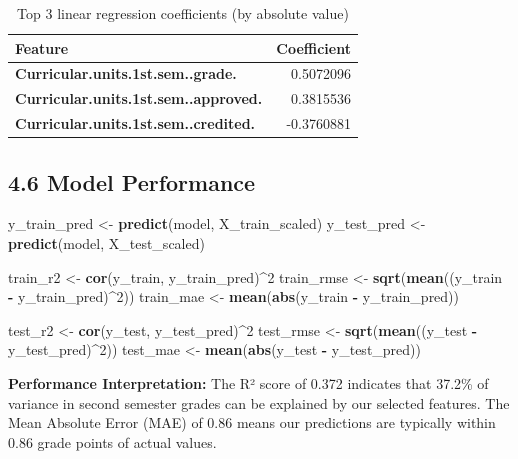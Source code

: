 \documentclass[
]{article}
\newenvironment{Shaded}{\begin{snugshade}}{\end{snugshade}}
\newcommand{\DecValTok}[1]{\textcolor[rgb]{0.00,0.00,0.81}{#1}}
\newcommand{\FunctionTok}[1]{\textcolor[rgb]{0.13,0.29,0.53}{\textbf{#1}}}
\newcommand{\NormalTok}[1]{#1}
\newcommand{\OtherTok}[1]{\textcolor[rgb]{0.56,0.35,0.01}{#1}}
\newcommand{\SpecialCharTok}[1]{\textcolor[rgb]{0.81,0.36,0.00}{\textbf{#1}}}
\begin{document}
\begin{longtable}[t]{>{}lr}
\caption{\label{tab:linear-train}Top 3 linear regression coefficients (by absolute value)}\\
\toprule
Feature & Coefficient\\
\midrule
\textbf{Curricular.units.1st.sem..grade.} & 0.5072096\\
\textbf{Curricular.units.1st.sem..approved.} & 0.3815536\\
\textbf{Curricular.units.1st.sem..credited.} & -0.3760881\\
\bottomrule
\end{longtable}

\subsection{4.6 Model Performance}\label{model-performance}

\begin{Shaded}
\begin{Highlighting}[]
\NormalTok{y\_train\_pred }\OtherTok{\textless{}{-}} \FunctionTok{predict}\NormalTok{(model, X\_train\_scaled)}
\NormalTok{y\_test\_pred }\OtherTok{\textless{}{-}} \FunctionTok{predict}\NormalTok{(model, X\_test\_scaled)}

\NormalTok{train\_r2 }\OtherTok{\textless{}{-}} \FunctionTok{cor}\NormalTok{(y\_train, y\_train\_pred)}\SpecialCharTok{\^{}}\DecValTok{2}
\NormalTok{train\_rmse }\OtherTok{\textless{}{-}} \FunctionTok{sqrt}\NormalTok{(}\FunctionTok{mean}\NormalTok{((y\_train }\SpecialCharTok{{-}}\NormalTok{ y\_train\_pred)}\SpecialCharTok{\^{}}\DecValTok{2}\NormalTok{))}
\NormalTok{train\_mae }\OtherTok{\textless{}{-}} \FunctionTok{mean}\NormalTok{(}\FunctionTok{abs}\NormalTok{(y\_train }\SpecialCharTok{{-}}\NormalTok{ y\_train\_pred))}

\NormalTok{test\_r2 }\OtherTok{\textless{}{-}} \FunctionTok{cor}\NormalTok{(y\_test, y\_test\_pred)}\SpecialCharTok{\^{}}\DecValTok{2}
\NormalTok{test\_rmse }\OtherTok{\textless{}{-}} \FunctionTok{sqrt}\NormalTok{(}\FunctionTok{mean}\NormalTok{((y\_test }\SpecialCharTok{{-}}\NormalTok{ y\_test\_pred)}\SpecialCharTok{\^{}}\DecValTok{2}\NormalTok{))}
\NormalTok{test\_mae }\OtherTok{\textless{}{-}} \FunctionTok{mean}\NormalTok{(}\FunctionTok{abs}\NormalTok{(y\_test }\SpecialCharTok{{-}}\NormalTok{ y\_test\_pred))}
\end{Highlighting}
\end{Shaded}

\textbf{Performance Interpretation:} The R² score of 0.372 indicates
that 37.2\% of variance in second semester grades can be explained by
our selected features. The Mean Absolute Error (MAE) of 0.86 means our
predictions are typically within 0.86 grade points of actual values.
\end{document}
